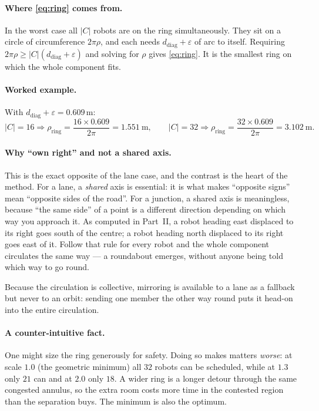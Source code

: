 \documentclass[11pt,a4paper]{article}
\begin{document}
\paragraph{Where \eqref{eq:ring} comes from.} In the worst case all $|C|$ robots are on the
ring simultaneously. They sit on a circle of circumference $2\pi\rho$, and each needs
$d_{\mathrm{diag}} + \varepsilon$ of arc to itself. Requiring
$2\pi\rho \ge |C|(d_{\mathrm{diag}} + \varepsilon)$ and solving for $\rho$ gives
\eqref{eq:ring}. It is the smallest ring on which the whole component fits.

\paragraph{Worked example.} With $d_{\mathrm{diag}} + \varepsilon = 0.609$\,m:
\[
|C| = 16 \Rightarrow \rho_{\mathrm{ring}} = \frac{16 \times 0.609}{2\pi} = 1.551\ \text{m},
\qquad
|C| = 32 \Rightarrow \rho_{\mathrm{ring}} = \frac{32 \times 0.609}{2\pi} = 3.102\ \text{m}.
\]

\paragraph{Why ``own right'' and not a shared axis.} This is the exact opposite of the lane
case, and the contrast is the heart of the method. For a lane, a \emph{shared} axis is
essential: it is what makes ``opposite signs'' mean ``opposite sides of the road''. For a
junction, a shared axis is meaningless, because ``the same side'' of a point is a different
direction depending on which way you approach it. As computed in Part~II, a robot heading
east displaced to its right goes south of the centre; a robot heading north displaced to its
right goes east of it. Follow that rule for every robot and the whole component circulates
the same way --- a roundabout emerges, without anyone being told which way to go round.

Because the circulation is collective, mirroring is available to a lane as a fallback but
never to an orbit: sending one member the other way round puts it head-on into the entire
circulation.

\paragraph{A counter-intuitive fact.} One might size the ring generously for safety. Doing
so makes matters \emph{worse}: at scale $1.0$ (the geometric minimum) all $32$ robots can be
scheduled, while at $1.3$ only $21$ can and at $2.0$ only $18$. A wider ring is a longer
detour through the same congested annulus, so the extra room costs more time in the
contested region than the separation buys. The minimum is also the optimum.
\end{document}

